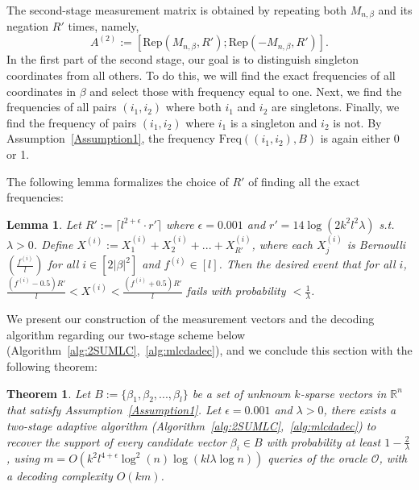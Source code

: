 \documentclass{article}
\newcommand\mc{\mathcal}
\newtheorem{theorem}{Theorem}[section]
\newtheorem{lemma}{Lemma}[section]
\begin{document}
The second-stage measurement matrix is obtained by repeating both $M_{n,\beta}$ and its negation $R'$ times, namely,
\[
A^{(2)} := [\mathrm{Rep}(M_{n,\beta}, R');\mathrm{Rep}(-M_{n,\beta}, R')].
\]
In the first part of the second stage, our goal is to distinguish singleton coordinates from all others. To do this, we will find the exact frequencies of all coordinates in $\beta$ and select those with frequency equal to one. 
Next, we find the frequencies of all pairs $(i_1, i_2)$ where both $i_1$ and $i_2$ are singletons. 
Finally, we find the frequency of pairs $(i_1,i_2)$ where $i_1$ is a singleton and $i_2$ is not. By Assumption~\ref{Assumption1}, the frequency $\text{Freq}((i_1,i_2),B)$ is again either 0 or 1.

The following lemma formalizes the choice of $R'$ of finding all the exact frequencies: 

\begin{lemma}\label{lem:rep2}
    Let $R':=\lceil l^{2+\epsilon}\cdot r'\rceil$ where $\epsilon=0.001$ and $r'=14\log(2k^2l^2\lambda)$ s.t. $\lambda>0$. Define $X^{(i)}:=X_1^{(i)}+X_2^{(i)}+...+X_{R'}^{(i)}$, where each $X_j^{(i)}$ is Bernoulli $(\frac{f^{(i)}}{l})$ for all $i\in[2|\beta|^2]$ and $f^{(i)}\in[l]$. Then the desired event that for all $i$, $\frac{(f^{(i)}-0.5)R'}{l}<X^{(i)}<\frac{(f^{(i)}+0.5)R'}{l}$ fails with probability $<\frac{1}{\lambda}$. 
\end{lemma}
We present our construction of the measurement vectors and the decoding algorithm regarding our two-stage scheme below (Algorithm~\ref{alg:2SUMLC},~\ref{alg:mlcdadec}), and we conclude this section with the following theorem: 
\begin{theorem}\label{thm1}
    Let $B:=\{\beta_1,\beta_2,...,\beta_l\}$ be a set of unknown $k$-sparse vectors in $\mathbb{R}^n$ that satisfy Assumption~\ref{Assumption1}. Let $\epsilon=0.001$ and $\lambda>0$, there exists a two-stage adaptive algorithm (Algorithm~\ref{alg:2SUMLC},~\ref{alg:mlcdadec}) to recover the support of every candidate vector $\beta_i\in B$ with probability at least $1 - \frac{2}{\lambda}$, using $m=O(k^2l^{4+\epsilon}\log^2 (n)\log (kl\lambda\log n))$ queries of the oracle $\mc{O}$, with a decoding  complexity $O(km)$.
\end{theorem}
\end{document}
